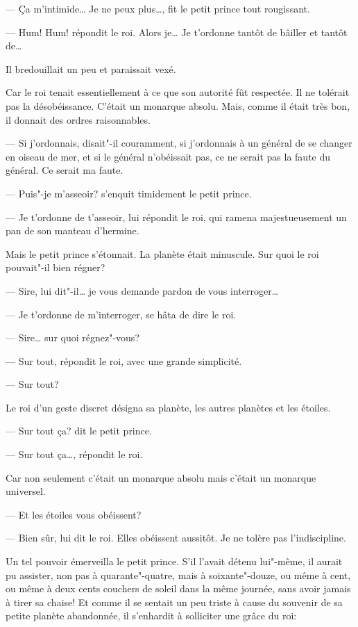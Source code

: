 \begin{Parallel}[p]{}{}
{--- Ça m'intimide\ldots{} Je ne peux plus\ldots{}, fit le petit
prince tout rougissant.

--- Hum! Hum! répondit le roi. Alors je\ldots{} Je t'ordonne tantôt de bâiller et tantôt de\ldots{}

Il bredouillait un peu et paraissait vexé.

Car le roi tenait essentiellement à ce que son
autorité fût respectée. Il ne tolérait pas la désobéissance. C'était un monarque absolu. Mais, comme il
était très bon, il donnait des ordres raisonnables.

--- Si j'ordonnais, disait"-il couramment, si j'ordonnais à un général de se changer en oiseau de mer, et si le général n'obéissait pas, ce ne serait pas la faute du général. Ce serait ma faute.

--- Puis"-je m'asseoir? s'enquit timidement le petit prince.

--- Je t'ordonne de t'asseoir, lui répondit le roi, qui ramena majestueusement un pan de son manteau d'hermine.

Mais le petit prince s'étonnait. La planète était
minuscule. Sur quoi le roi pouvait"-il bien régner?

--- Sire, lui dit"-il\ldots{} je vous demande pardon de
vous interroger\ldots{}

--- Je t'ordonne de m'interroger, se hâta de dire le roi.

--- Sire\ldots{} sur quoi régnez"-vous?

--- Sur tout, répondit le roi, avec une grande simplicité.

--- Sur tout?

Le roi d'un geste discret désigna sa planète, les
autres planètes et les étoiles.

--- Sur tout ça? dit le petit prince.

--- Sur tout ça\ldots{}, répondit le roi.

Car non seulement c'était un monarque absolu mais c'était un monarque universel.

--- Et les étoiles vous obéissent?

--- Bien sûr, lui dit le roi. Elles obéissent aussitôt. Je ne tolère pas l'indiscipline.

Un tel pouvoir émerveilla le petit prince. S'il l'avait détenu lui"-même, il aurait pu assister, non pas à
quarante"-quatre, mais à soixante"-douze, ou même à
cent, ou même à deux cents couchers de soleil
dans la même journée, sans avoir jamais à tirer sa
chaise! Et comme il se sentait un peu triste à cause
du souvenir de sa petite planète abandonnée, il
s'enhardit à solliciter une grâce du roi:

}
\end{Parallel}
